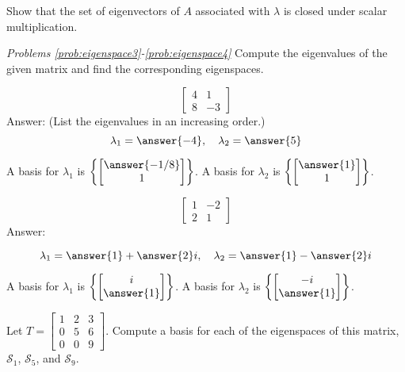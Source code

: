 \documentclass{ximera}
\begin{document}
\begin{problem}\label{prob:eigenspace2}
Show that the set of eigenvectors of $A$ associated with $\lambda$ is closed under scalar multiplication.
\end{problem}


\emph{Problems \ref{prob:eigenspace3}-\ref{prob:eigenspace4}}
Compute the eigenvalues of the given matrix and find the corresponding eigenspaces.

\begin{problem}\label{prob:eigenspace3}
$$\begin{bmatrix}4&1\\8&-3\end{bmatrix}$$
Answer:
(List the eigenvalues in an increasing order.)
$$\lambda_1=\answer{-4},\quad\lambda_2=\answer{5}$$

A basis for $\lambda_1$ is $\left\{\begin{bmatrix}\answer{-1/8}\\1\end{bmatrix}\right\}$.  A basis for $\lambda_2$ is $\left\{\begin{bmatrix}\answer{1}\\1\end{bmatrix}\right\}$.
\end{problem}

\begin{problem}\label{prob:eigenspace4}
$$\begin{bmatrix}1&-2\\2&1\end{bmatrix}$$
Answer:

$$\lambda_1=\answer{1}+\answer{2}i,\quad\lambda_2=\answer{1}-\answer{2}i$$

A basis for $\lambda_1$ is $\left\{\begin{bmatrix}i\\\answer{1}\end{bmatrix}\right\}$.  A basis for $\lambda_2$ is $\left\{\begin{bmatrix}-i\\\answer{1}\end{bmatrix}\right\}$.
\end{problem}


\begin{problem}\label{prob:3x3tri_ev}
Let $T=\begin{bmatrix} 1 & 2 & 3\\ 0 & 5 & 6\\ 0 & 0 & 9\end{bmatrix}$.  Compute a basis for each of the eigenspaces of this matrix, $\mathcal{S}_1$, $\mathcal{S}_5$, and $\mathcal{S}_9$.
\end{problem}
\end{document}
